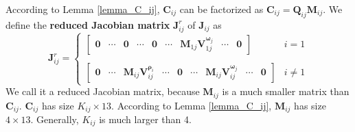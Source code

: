 \documentclass{vgtc}                          %
\begin{document}


According to Lemma \autoref{lemma_C_ij}, $\mathbf{C}_{ij}$ can be factorized as $\mathbf{C}_{ij} = \mathbf{Q}_{ij}\mathbf{M}_{ij}$.   We  define the \textbf{reduced  Jacobian matrix} $\mathbf{J}_{ij}^{r}$  of $\mathbf{J}_{ij}$ as 
\begin{equation} \label{equ_Jr_ij}
	\mathbf{J}_{ij}^{r} =\begin{cases} 
		\begin{bmatrix}
			\mathbf{0} & \cdots & \mathbf{0} &  \cdots  & \mathbf{0} & \cdots & \mathbf{M}_{1j}\bm{V}^{{\bm{\omega}}_{j}}_{1j} & \cdots  & \mathbf{0}
		\end{bmatrix}& i = 1\\
		\\
		\begin{bmatrix}
		\mathbf{0} & \cdots & \mathbf{M}_{ij}\bm{V}^{{\bm{\rho}}_{i}}_{ij} &  \cdots  & \mathbf{0} & \cdots & \mathbf{M}_{ij}\bm{V}^{{\bm{\omega}}_{j}}_{ij} & \cdots  & \mathbf{0} 
		\end{bmatrix}  & i \neq 1
	\end{cases}
\end{equation}
We call it a reduced  Jacobian matrix, because $\mathbf{M}_{ij}$ is a much smaller matrix than $\mathbf{C}_{ij}$. $\mathbf{C}_{ij}$ has   size $K_{ij} \times 13$. According to Lemma \autoref{lemma_C_ij}, $\mathbf{M}_{ij}$ has  size $4 \times 13$. Generally, $K_{ij}$ is much larger than 4.
\end{document}

